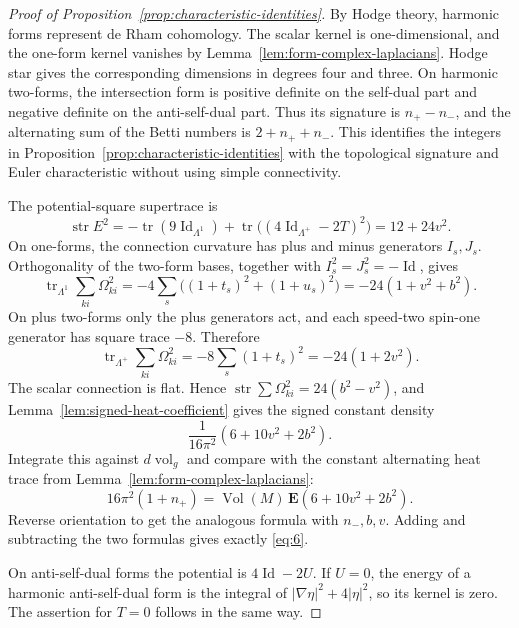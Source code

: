 \begin{proof}[Proof of Proposition~\ref{prop:characteristic-identities}]
By Hodge theory, harmonic forms represent de Rham cohomology. The
scalar kernel is one-dimensional, and the one-form kernel vanishes by
Lemma~\ref{lem:form-complex-laplacians}. Hodge star gives the corresponding
dimensions in degrees four and three. On harmonic two-forms, the
intersection form is positive definite on the self-dual part and negative
definite on the anti-self-dual part. Thus its signature is $n_+-n_-$,
and the alternating sum of the Betti numbers is $2+n_++n_-$. This
identifies the integers in Proposition~\ref{prop:characteristic-identities}
with the topological signature and Euler characteristic without using
simple connectivity.

The potential-square supertrace is
\[
 \operatorname{str}E^2
 =-\operatorname{tr}(9\operatorname{Id}_{\Lambda^1})
   +\operatorname{tr}\bigl((4\operatorname{Id}_{\Lambda^+}-2T)^2\bigr)
 =12+24v^2.
\]
On one-forms, the connection curvature has plus and minus
generators $I_s,J_s$. Orthogonality of the two-form bases,
together with $I_s^2=J_s^2=-\operatorname{Id}$, gives
\[
 \operatorname{tr}_{\Lambda^1}\sum_{ki}\Omega_{ki}^2
 =-4\sum_s\bigl((1+t_s)^2+(1+u_s)^2\bigr)
 =-24(1+v^2+b^2).
\]
On plus two-forms only the plus generators act, and each
speed-two spin-one generator has square trace $-8$.
Therefore
\[
 \operatorname{tr}_{\Lambda^+}\sum_{ki}\Omega_{ki}^2
 =-8\sum_s(1+t_s)^2=-24(1+2v^2).
\]
The scalar connection is flat. Hence
$\operatorname{str}\sum\Omega_{ki}^2=24(b^2-v^2)$, and
Lemma~\ref{lem:signed-heat-coefficient} gives the signed
constant density
\[
 \frac1{16\pi^2}(6+10v^2+2b^2).
\]
Integrate this against $d\operatorname{vol}_g$ and compare
with the constant alternating heat trace from
Lemma~\ref{lem:form-complex-laplacians}:
\[
 16\pi^2(1+n_+)
 =\operatorname{Vol}(M)\,
       \mathbf E(6+10v^2+2b^2).
\]
Reverse orientation to get the analogous formula with
$n_-,b,v$. Adding and subtracting the two formulas gives
exactly \eqref{eq:6}.

On anti-self-dual forms the potential is
$4\operatorname{Id}-2U$. If $U=0$, the energy of a harmonic
anti-self-dual form is the integral of
$|\nabla\eta|^2+4|\eta|^2$, so its kernel is zero.
The assertion for $T=0$ follows in the same way.
\end{proof}
